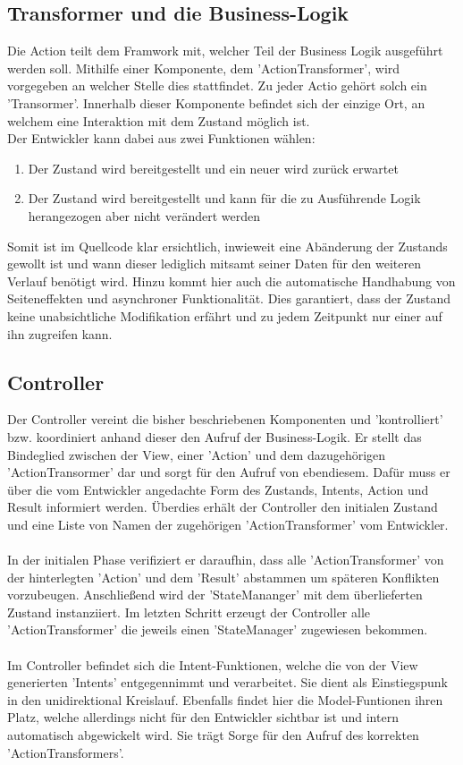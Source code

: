 \subsection{Transformer und die Business-Logik}
Die Action teilt dem Framwork mit, welcher Teil der Business Logik ausgeführt werden soll. Mithilfe einer Komponente, dem 'ActionTransformer', wird vorgegeben an welcher Stelle dies stattfindet. Zu jeder Actio gehört solch ein 'Transormer'. Innerhalb dieser Komponente befindet sich der einzige Ort, an welchem eine Interaktion mit dem Zustand möglich ist.
\\
Der Entwickler kann dabei aus zwei Funktionen wählen:
\begin{enumerate}
	\item Der Zustand wird bereitgestellt und ein neuer wird zurück erwartet
	\item Der Zustand wird bereitgestellt und kann für die zu Ausführende Logik herangezogen aber nicht verändert werden 
\end{enumerate}
\bigskip
Somit ist im Quellcode klar ersichtlich, inwieweit eine Abänderung der Zustands gewollt ist und wann dieser lediglich mitsamt seiner Daten für den weiteren Verlauf benötigt wird. Hinzu kommt hier auch die automatische Handhabung von Seiteneffekten und asynchroner Funktionalität. Dies garantiert, dass der Zustand keine unabsichtliche Modifikation erfährt und zu jedem Zeitpunkt nur einer auf ihn zugreifen kann.

\subsection{Controller}
Der Controller vereint die bisher beschriebenen Komponenten und 'kontrolliert' bzw. koordiniert anhand dieser den Aufruf der Business-Logik. Er stellt das Bindeglied zwischen der View, einer 'Action' und dem dazugehörigen 'ActionTransormer' dar und sorgt für den Aufruf von ebendiesem. Dafür muss er über die vom Entwickler angedachte Form des Zustands, Intents, Action und Result informiert werden. Überdies erhält der Controller den initialen Zustand und eine Liste von Namen der zugehörigen 'ActionTransformer' vom Entwickler.
\\\\
In der initialen Phase verifiziert er daraufhin, dass alle 'ActionTransformer' von der hinterlegten 'Action' und dem 'Result' abstammen um späteren Konflikten vorzubeugen. Anschließend wird der 'StateMananger' mit dem überlieferten Zustand instanziiert. Im letzten Schritt erzeugt der Controller alle 'ActionTransformer' die jeweils einen 'StateManager' zugewiesen bekommen.
\\\\
Im Controller befindet sich die Intent-Funktionen, welche die von der View generierten 'Intents' entgegennimmt und verarbeitet. Sie dient als Einstiegspunk in den unidirektional Kreislauf. Ebenfalls findet hier die Model-Funtionen ihren Platz, welche allerdings nicht für den Entwickler sichtbar ist und intern automatisch abgewickelt wird. Sie trägt Sorge für den Aufruf des korrekten 'ActionTransformers'. 

